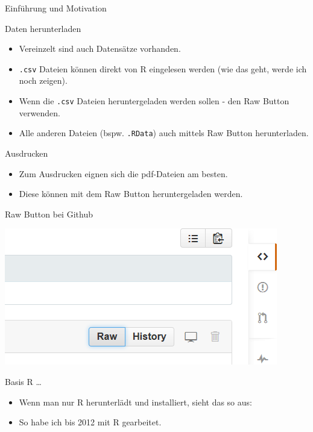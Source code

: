 \documentclass[ignorenonframetext,]{beamer}
\providecommand{\tightlist}{%
\setlength{\itemsep}{0pt}\setlength{\parskip}{0pt}}
\begin{document}
\begin{frame}[fragile]{Einführung und Motivation}
\begin{block}{Daten herunterladen}
\begin{itemize}
\item
  Vereinzelt sind auch Datensätze vorhanden.
\item
  \texttt{.csv} Dateien können direkt von R eingelesen werden (wie das
  geht, werde ich noch zeigen).
\item
  Wenn die \texttt{.csv} Dateien heruntergeladen werden sollen - den Raw
  Button verwenden.
\item
  Alle anderen Dateien (bspw. \texttt{.RData}) auch mittels Raw Button
  herunterladen.
\end{itemize}

\end{block}

\begin{block}{Ausdrucken}

\begin{itemize}
\item
  Zum Ausdrucken eignen sich die pdf-Dateien am besten.
\item
  Diese können mit dem Raw Button heruntergeladen werden.
\end{itemize}

\begin{block}{Raw Button bei Github}

\includegraphics{./tex2pdf.9796/f21c789340eb93fc24ffedb3e3f88df872b9bb2c.png}

\end{block}

\end{block}

\begin{block}{Basis R \ldots{}}

\begin{itemize}
\tightlist
\item
  Wenn man nur R herunterlädt und installiert, sieht das so aus:
\item
  So habe ich bis 2012 mit R gearbeitet.
\end{itemize}


\end{block}
\end{frame}
\end{document}
